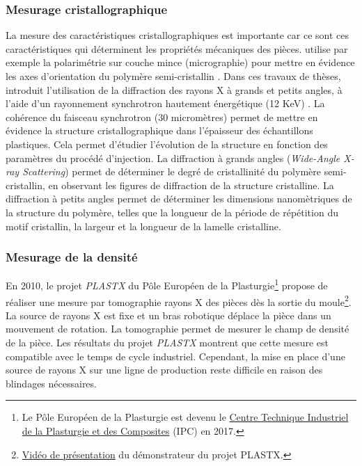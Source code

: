 \subsubsection{Mesurage cristallographique}
La mesure des caractéristiques cristallographiques est importante car ce sont ces caractéristiques qui déterminent les propriétés mécaniques des pièces.
\citeauthor{mendoza_spatial_2003} utilise par exemple la polarimétrie sur couche mince (micrographie) pour mettre en évidence les axes d'orientation du polymère semi-cristallin \cite{mendoza_spatial_2003}.
Dans ces travaux de thèses, \citeauthor{malhab_moulage_2012} introduit l'utilisation de la diffraction des rayons X à grands et petits angles, à l'aide d'un rayonnement synchrotron hautement énergétique (12 KeV) \cite{malhab_moulage_2012}.
La cohérence du faisceau synchrotron (30 micromètres) permet de mettre en évidence la structure cristallographique dans l'épaisseur des échantillons plastiques.
Cela permet d'étudier l'évolution de la structure en fonction des paramètres du procédé d'injection.
La diffraction à grands angles (\textit{Wide-Angle X-ray Scattering}) permet de déterminer le degré de cristallinité du polymère semi-cristallin, en observant les figures de diffraction de la structure cristalline.  %
La diffraction à petits angles permet de déterminer les dimensions nanomètriques de la structure du polymère, telles que la longueur de la période de répétition du motif cristallin, la largeur et la longueur de la lamelle cristalline.

\subsubsection{Mesurage de la densité}
En 2010, le projet \textit{PLASTX} du Pôle Européen de la Plasturgie\footnote{Le Pôle Européen de la Plasturgie est devenu le \href{https://ct-ipc.com/}{Centre Technique Industriel de la Plasturgie et des Composites} (IPC) en 2017.} propose de réaliser une mesure par tomographie rayons X des pièces dès la sortie du moule\footnote{\href{https://vimeo.com/50358748}{Vidéo de présentation} du démonstrateur du projet PLASTX.}.
La source de rayons X est fixe et un bras robotique déplace la pièce dans un mouvement de rotation.
La tomographie permet de mesurer le champ de densité de la pièce.  %
Les résultats du projet \textit{PLASTX} montrent que cette mesure est compatible avec le temps de cycle industriel.
Cependant, la mise en place d'une source de rayons X sur une ligne de production reste difficile en raison des blindages nécessaires.

